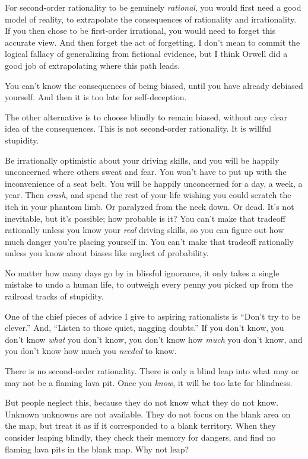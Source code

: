 {
 For second-order rationality to be genuinely \textit{rational},
you would first need a good model of reality, to extrapolate the
consequences of rationality and irrationality. If you then chose to be
first-order irrational, you would need to forget this accurate view.
And then forget the act of forgetting. I don't mean to
commit the logical fallacy of generalizing from fictional evidence, but
I think Orwell did a good job of extrapolating where this path leads.}

{
 You can't know the consequences of being biased,
until you have already debiased yourself. And then it is too late for
self-deception.}

{
 The other alternative is to choose blindly to remain biased,
without any clear idea of the consequences. This is not second-order
rationality. It is willful stupidity.}

{
 Be irrationally optimistic about your driving skills, and you will
be happily unconcerned where others sweat and fear. You
won't have to put up with the inconvenience of a seat
belt. You will be happily unconcerned for a day, a week, a year. Then
\textit{crash}, and spend the rest of your life wishing you could
scratch the itch in your phantom limb. Or paralyzed from the neck down.
Or dead. It's not inevitable, but it's
possible; how probable is it? You can't make that
tradeoff rationally unless you know your \textit{real} driving skills,
so you can figure out how much danger you're placing
yourself in. You can't make that tradeoff rationally
unless you know about biases like neglect of probability.}

{
 No matter how many days go by in blissful ignorance, it only takes
a single mistake to undo a human life, to outweigh every penny you
picked up from the railroad tracks of stupidity.}

{
 One of the chief pieces of advice I give to aspiring rationalists
is ``Don't try to be
clever.'' And, ``Listen to those
quiet, nagging doubts.'' If you don't
know, you don't know \textit{what} you
don't know, you don't know how
\textit{much} you don't know, and you
don't know how much you \textit{needed} to know.}

{
 There is no second-order rationality. There is only a blind leap
into what may or may not be a flaming lava pit. Once you \textit{know},
it will be too late for blindness.}

{
 But people neglect this, because they do not know what they do not
know. Unknown unknowns are not available. They do not focus on the
blank area on the map, but treat it as if it corresponded to a blank
territory. When they consider leaping blindly, they check their memory
for dangers, and find no flaming lava pits in the blank map. Why not
leap?}

